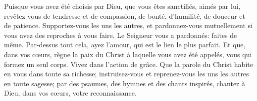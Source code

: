 Puisque vous avez été choisis par Dieu,
	que vous êtes sanctifiés, aimés par lui,
	revêtez-vous de tendresse et de compassion,
	de bonté, d’humilité, de douceur et de patience.
Supportez-vous les uns les autres,
	et pardonnez-vous mutuellement si vous avez des reproches à vous faire.
	Le Seigneur vous a pardonnés: faites de même.
Par-dessus tout cela, ayez l’amour, qui est le lien le plus parfait.
Et que, dans vos cœurs,
		règne la paix du Christ à laquelle vous avez été appelés,
	vous qui formez un seul corps.
	Vivez dans l’action de grâce.
Que la parole du Christ habite en vous dans toute sa richesse;
	instruisez-vous et reprenez-vous les uns les autres en toute sagesse;
	par des psaumes, des hymnes et des chants inspirés,
	chantez à Dieu, dans vos cœurs, votre reconnaissance.

